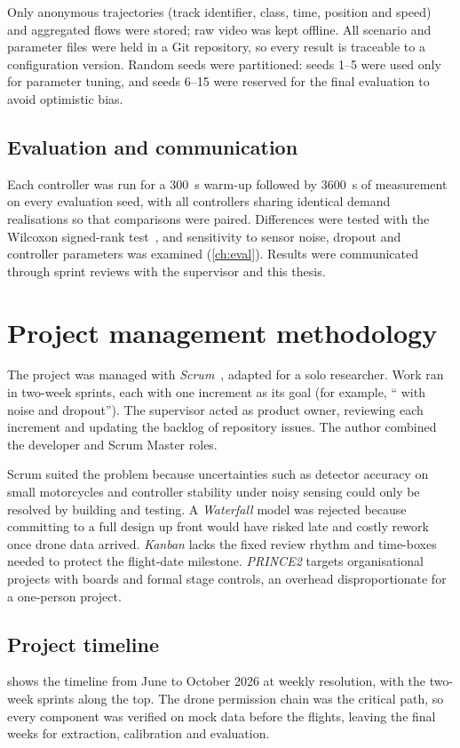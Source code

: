 Only anonymous trajectories (track identifier, class, time, position and speed) and aggregated flows were stored; raw video was kept offline. All scenario and parameter files were held in a Git repository, so every result is traceable to a configuration version. Random seeds were partitioned: seeds 1--5 were used only for parameter tuning, and seeds 6--15 were reserved for the final evaluation to avoid optimistic bias.

\subsection{Evaluation and communication}
Each controller was run for a 300~s warm-up followed by 3600~s of measurement on every evaluation seed, with all controllers sharing identical demand realisations so that comparisons were paired. Differences were tested with the Wilcoxon signed-rank test~\cite{wilcoxon1945}, and sensitivity to sensor noise, dropout and controller parameters was examined (\cref{ch:eval}). Results were communicated through sprint reviews with the supervisor and this thesis.

\section{Project management methodology}\label{sec:method-pm}

The project was managed with \emph{Scrum}~\cite{schwaber2020scrum}, adapted for a solo researcher. Work ran in two-week sprints, each with one increment as its goal (for example, ``\vls{} with noise and dropout''). The supervisor acted as product owner, reviewing each increment and updating the backlog of repository issues. The author combined the developer and Scrum Master roles.

Scrum suited the problem because uncertainties such as detector accuracy on small motorcycles and controller stability under noisy sensing could only be resolved by building and testing. A \emph{Waterfall} model was rejected because committing to a full design up front would have risked late and costly rework once drone data arrived. \emph{Kanban} lacks the fixed review rhythm and time-boxes needed to protect the flight-date milestone. \emph{PRINCE2} targets organisational projects with boards and formal stage controls, an overhead disproportionate for a one-person project.

\subsection{Project timeline}
 shows the timeline from June to October 2026 at weekly resolution, with the two-week sprints along the top. The drone permission chain was the critical path, so every component was verified on mock data before the flights, leaving the final weeks for extraction, calibration and evaluation.

